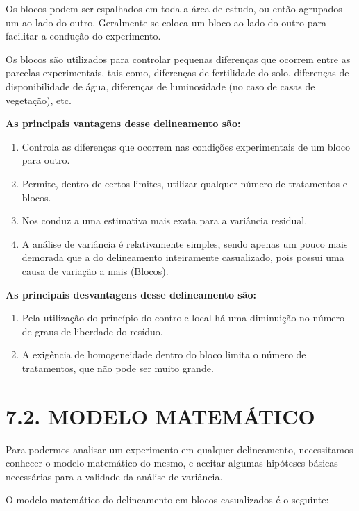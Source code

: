 \documentclass[
]{book}
\begin{document}
Os blocos podem ser espalhados em toda a área de estudo, ou então agrupados um ao lado do outro. Geralmente se coloca um bloco ao lado do outro para facilitar a condução do experimento.

Os blocos são utilizados para controlar pequenas diferenças que ocorrem entre as parcelas experimentais, tais como, diferenças de fertilidade do solo, diferenças de disponibilidade de água, diferenças de luminosidade (no caso de casas de vegetação), etc.

\textbf{As principais vantagens desse delineamento são:}

\begin{enumerate}
\def\labelenumi{\arabic{enumi}.}
\item
  Controla as diferenças que ocorrem nas condições experimentais de um bloco para outro.
\item
  Permite, dentro de certos limites, utilizar qualquer número de tratamentos e blocos.
\item
  Nos conduz a uma estimativa mais exata para a variância residual.
\item
  A análise de variância é relativamente simples, sendo apenas um pouco mais demorada que a do delineamento inteiramente casualizado, pois possui uma causa de variação a mais (Blocos).
\end{enumerate}

\textbf{As principais desvantagens desse delineamento são:}

\begin{enumerate}
\def\labelenumi{\arabic{enumi}.}
\item
  Pela utilização do princípio do controle local há uma diminuição no número de graus de liberdade do resíduo.
\item
  A exigência de homogeneidade dentro do bloco limita o número de tratamentos, que não pode ser muito grande.
\end{enumerate}

\hypertarget{modelo-matemuxe1tico}{%
\section{7.2. MODELO MATEMÁTICO}\label{modelo-matemuxe1tico}}

Para podermos analisar um experimento em qualquer delineamento, necessitamos conhecer o modelo matemático do mesmo, e aceitar algumas hipóteses básicas necessárias para a validade da análise de variância.

O modelo matemático do delineamento em blocos casualizados é o seguinte:
\end{document}
